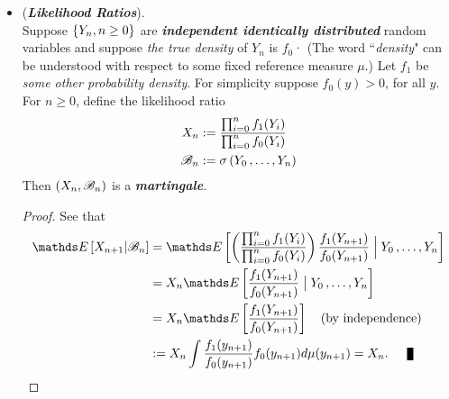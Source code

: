\documentclass[11pt]{article}
\begin{document}
\begin{itemize}
\item \begin{example} (\emph{\textbf{Likelihood Ratios}}).\\ 
Suppose $\left\{Y_n, n \ge 0\right\}$ are \emph{\textbf{independent identically distributed}} random variables and suppose \emph{the true density} of $Y_n$ is $f_0$· (The word ``\emph{density}" can be understood with respect to some fixed reference measure $\mu$.)  Let $f_1$ be \emph{some other probability density}. For simplicity suppose $f_0(y) > 0$, for all $y$.  For $n \ge 0$, define the likelihood ratio
\begin{align*}
X_n &:= \frac{\prod_{i=0}^{n}f_1(Y_i)}{\prod_{i=0}^{n}f_0(Y_i)}\\
{\mathscr B}_n &:= \sigma\left(Y_0 \,{,}\ldots{,}\, Y_n\right)
\end{align*} Then $(X_n, {\mathscr B}_n)$ is a \emph{\textbf{martingale}}.
\end{example}
\begin{proof}
See that
\begin{align*}
\E{}{X_{n+1} | \srB_n} &= \E{}{ \paren{\frac{\prod_{i=0}^{n}f_1(Y_i)}{\prod_{i=0}^{n}f_0(Y_i)}}\frac{f_1(Y_{n+1})}{f_0(Y_{n+1})} \;  \Big| \; Y_0 \xdotx{,} Y_{n}}\\
&= X_n \E{}{\frac{f_1(Y_{n+1})}{f_0(Y_{n+1})} \;  \big| \; Y_0 \xdotx{,} Y_{n}} \\
&= X_n \E{}{\frac{f_1(Y_{n+1})}{f_0(Y_{n+1})}} \quad (\text{by independence})\\
&:= X_n \int \frac{f_1(y_{n+1})}{f_0(y_{n+1})} f_0(y_{n+1}) d\mu(y_{n+1}) = X_n. \qed
\end{align*}
\end{proof}
\end{itemize}
\end{document}
